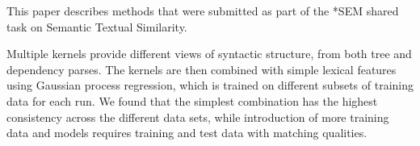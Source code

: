 This paper describes methods that were submitted as part of the *SEM shared task on Semantic Textual Similarity. 
 
 Multiple kernels provide different views of syntactic structure, from both tree
 and dependency parses. The kernels are then combined with simple lexical
 features using Gaussian process regression, which is trained on different
 subsets of training data for each run. We found that the simplest combination
 has the highest consistency across the different data sets, while introduction
 of more training data and models requires training and test data with matching
 qualities.

